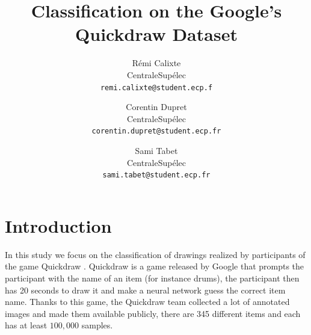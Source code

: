 \documentclass[10pt,twocolumn,letterpaper]{article}
\begin{document}
\title{Classification on the Google's Quickdraw Dataset}

\author{Rémi Calixte\\
CentraleSupélec\\
{\tt\small remi.calixte@student.ecp.f}
\and
Corentin Dupret\\
CentraleSupélec\\
{\tt\small corentin.dupret@student.ecp.fr}
\and
Sami Tabet\\
CentraleSupélec\\
{\tt\small sami.tabet@student.ecp.fr}
}

\newcommand{\rnnTitle}{Recurrent Neural Networks on the drawn strokes}
\newcommand{\cnnTitle}{Convolutional Neural Networks on 28x28 grayscale bitmaps}
\newcommand{\imgenTitle}{Transfer Learning of Convolutional Neural Networks on 64x64 and 96x96 images generated from drawn strokes}


\maketitle


\section{Introduction}

In this study we focus on the classification of drawings realized by participants of the game Quickdraw \cite{GoogleQuickdraw}. Quickdraw is a game released by Google that prompts the participant with the name of an item  (for instance drums), the participant then has 20 seconds to draw it and make a neural network guess the correct item name. Thanks to this game, the Quickdraw team collected a lot of annotated images and made them available publicly, there are 345 different items and each has at least $100,000$ samples.
\end{document}
